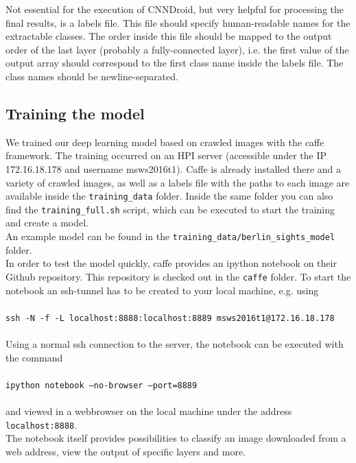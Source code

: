 Not essential for the execution of CNNDroid, but very helpful for processing the final results, is a labels file. This file should specify human-readable names for the extractable classes. The order inside this file should be mapped to the output order of the last layer (probably a fully-connected layer), i.e. the first value of the output array should correspond to the first class name inside the labels file. The class names should be newline-separated.

\subsection{Training the model}
We trained our deep learning model based on crawled images with the caffe framework. The training occurred on an HPI server (accessible under the IP 172.16.18.178 and username msws2016t1). Caffe is already installed there and a variety of crawled images, as well as a labels file with the paths to each image are available inside the \texttt{training\_data} folder. Inside the same folder you can also find the \texttt{training\_full.sh} script, which can be executed to start the training and create a model.\\
An example model can be found in the \texttt{training\_data/berlin\_sights\_model} folder.\\
In order to test the model quickly, caffe provides an ipython notebook on their Github repository. This repository is checked out in the \texttt{caffe} folder. To start the notebook an ssh-tunnel has to be created to your local machine, e.g. using\\\\
\texttt{ssh -N -f -L localhost:8888:localhost:8889 msws2016t1@172.16.18.178}\\\\
Using a normal ssh connection to the server, the notebook can be executed with the command\\\\
\texttt{ipython notebook --no-browser --port=8889}\\\\
and viewed in a webbrowser on the local machine under the address \texttt{localhost:8888}.\\
The notebook itself provides possibilities to classify an image downloaded from a web address, view the output of specific layers and more.

